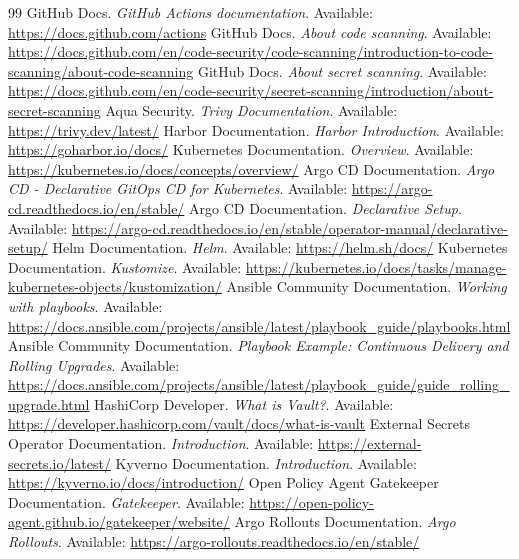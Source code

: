 \documentclass[10pt,letterpaper]{article}
\begin{document}
\begin{thebibliography}{99}
 GitHub Docs. \emph{GitHub Actions documentation}. Available: \url{https://docs.github.com/actions}
 GitHub Docs. \emph{About code scanning}. Available: \url{https://docs.github.com/en/code-security/code-scanning/introduction-to-code-scanning/about-code-scanning}
 GitHub Docs. \emph{About secret scanning}. Available: \url{https://docs.github.com/en/code-security/secret-scanning/introduction/about-secret-scanning}
 Aqua Security. \emph{Trivy Documentation}. Available: \url{https://trivy.dev/latest/}
 Harbor Documentation. \emph{Harbor Introduction}. Available: \url{https://goharbor.io/docs/}
 Kubernetes Documentation. \emph{Overview}. Available: \url{https://kubernetes.io/docs/concepts/overview/}
 Argo CD Documentation. \emph{Argo CD - Declarative GitOps CD for Kubernetes}. Available: \url{https://argo-cd.readthedocs.io/en/stable/}
 Argo CD Documentation. \emph{Declarative Setup}. Available: \url{https://argo-cd.readthedocs.io/en/stable/operator-manual/declarative-setup/}
 Helm Documentation. \emph{Helm}. Available: \url{https://helm.sh/docs/}
 Kubernetes Documentation. \emph{Kustomize}. Available: \url{https://kubernetes.io/docs/tasks/manage-kubernetes-objects/kustomization/}
 Ansible Community Documentation. \emph{Working with playbooks}. Available: \url{https://docs.ansible.com/projects/ansible/latest/playbook_guide/playbooks.html}
 Ansible Community Documentation. \emph{Playbook Example: Continuous Delivery and Rolling Upgrades}. Available: \url{https://docs.ansible.com/projects/ansible/latest/playbook_guide/guide_rolling_upgrade.html}
 HashiCorp Developer. \emph{What is Vault?}. Available: \url{https://developer.hashicorp.com/vault/docs/what-is-vault}
 External Secrets Operator Documentation. \emph{Introduction}. Available: \url{https://external-secrets.io/latest/}
 Kyverno Documentation. \emph{Introduction}. Available: \url{https://kyverno.io/docs/introduction/}
 Open Policy Agent Gatekeeper Documentation. \emph{Gatekeeper}. Available: \url{https://open-policy-agent.github.io/gatekeeper/website/}
 Argo Rollouts Documentation. \emph{Argo Rollouts}. Available: \url{https://argo-rollouts.readthedocs.io/en/stable/}

\end{thebibliography}
\end{document}
